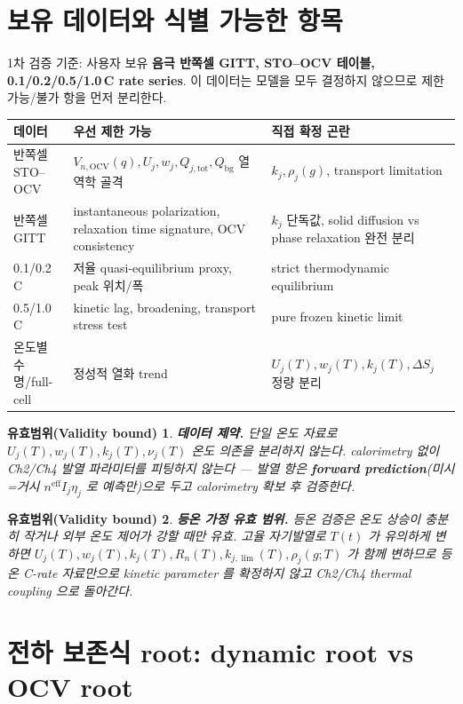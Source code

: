\documentclass[11pt,a4paper]{article}
\newtheorem*{boundbox}{유효범위(Validity bound)}
\newcommand{\eff}{\mathrm{eff}}
\newcommand{\tot}{\mathrm{tot}}
\newcommand{\bg}{\mathrm{bg}}
\newcommand{\OCV}{\mathrm{OCV}}
\begin{document}
\section{보유 데이터와 식별 가능한 항목}\label{sec:ch6_data}
1차 검증 기준: 사용자 보유 \textbf{음극 반쪽셀 GITT, STO--OCV 테이블, 0.1/0.2/0.5/1.0\,C rate series}. 이
데이터는 모델을 모두 결정하지 않으므로 제한 가능/불가 항을 먼저 분리한다.
\begin{longtable}{p{} p{} p{}}
\toprule 데이터 & 우선 제한 가능 & 직접 확정 곤란 \\ \midrule \endhead
반쪽셀 STO--OCV & $V_{n,\OCV}(q),U_j,w_j,Q_{j,\tot},Q_\bg$ 열역학 골격 & $k_j,\rho_j(g)$, transport limitation \\
반쪽셀 GITT & instantaneous polarization, relaxation time signature, OCV consistency & $k_j$ 단독값, solid diffusion vs phase relaxation 완전 분리 \\
0.1/0.2\,C & 저율 quasi-equilibrium proxy, peak 위치/폭 & strict thermodynamic equilibrium \\
0.5/1.0\,C & kinetic lag, broadening, transport stress test & pure frozen kinetic limit \\
온도별 수명/full-cell & 정성적 열화 trend & $U_j(T),w_j(T),k_j(T),\Delta S_j$ 정량 분리 \\
\bottomrule
\end{longtable}
\begin{boundbox}
\textbf{데이터 제약.} 단일 온도 자료로 $U_j(T),w_j(T),k_j(T),\nu_j(T)$ 온도 의존을 분리하지 않는다.
calorimetry 없이 Ch2/Ch4 발열 파라미터를 피팅하지 않는다 — 발열 항은 \textbf{forward prediction}(미시=거시
$n^{\eff}I_j\eta_j$ 로 예측만)으로 두고 calorimetry 확보 후 검증한다.
\end{boundbox}
\begin{boundbox}
\textbf{등온 가정 유효 범위.} 등온 검증은 온도 상승이 충분히 작거나 외부 온도 제어가 강할 때만 유효. 고율
자기발열로 $T(t)$ 가 유의하게 변하면 $U_j(T),w_j(T),k_j(T),R_n(T),k_{j,\lim}(T),\rho_j(g;T)$ 가 함께 변하므로
등온 C-rate 자료만으로 kinetic parameter 를 확정하지 않고 Ch2/Ch4 thermal coupling 으로 돌아간다.
\end{boundbox}

\section{전하 보존식 root: dynamic root vs OCV root}\label{sec:ch6_root}
\end{document}
